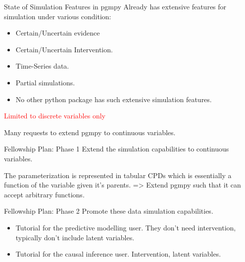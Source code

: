 \documentclass{beamer}
\begin{document}
\begin{frame}{State of Simulation Features in pgmpy}
	Already has extensive features for simulation under various condition:
	\begin{itemize}
		\item Certain/Uncertain evidence
		\item Certain/Uncertain Intervention.
		\item Time-Series data.
		\item Partial simulations.
	\end{itemize}

	\vspace{1em}
	\begin{itemize}
		\item No other python package has such extensive simulation features.
	\end{itemize}

	\vspace{3em}
	\centerline{\textcolor{red}{Limited to discrete variables only}}
	\centerline{Many requests to extend pgmpy to continuous variables.}



\end{frame}

\begin{frame}{Fellowship Plan: Phase 1}
	Extend the simulation capabilities to continuous variables.


	The parameterization is represented in tabular CPDs which is essentially a function of the variable given it's parents. => Extend pgmpy such that it can accept arbitrary functions.
\end{frame}

\begin{frame}{Fellowship Plan: Phase 2}
	Promote these data simulation capabilities.

	\begin{itemize}
		\item Tutorial for the predictive modelling user. They don't need intervention, typically don't include latent variables.
		\item Tutorial for the causal inference user. Intervention, latent variables.
	\end{itemize}
\end{frame}
\end{document}
